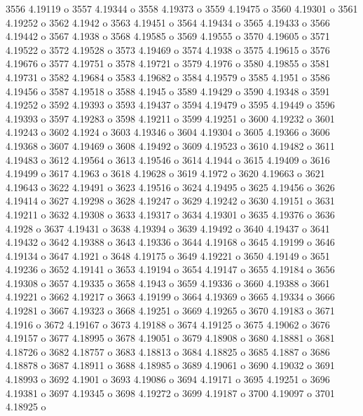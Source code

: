  3556  4.19119  o
 3557  4.19344  o
 3558  4.19373  o
 3559  4.19475  o
 3560  4.19301  o
 3561  4.19252  o
 3562  4.1942  o
 3563  4.19451  o
 3564  4.19434  o
 3565  4.19433  o
 3566  4.19442  o
 3567  4.1938  o
 3568  4.19585  o
 3569  4.19555  o
 3570  4.19605  o
 3571  4.19522  o
 3572  4.19528  o
 3573  4.19469  o
 3574  4.1938  o
 3575  4.19615  o
 3576  4.19676  o
 3577  4.19751  o
 3578  4.19721  o
 3579  4.1976  o
 3580  4.19855  o
 3581  4.19731  o
 3582  4.19684  o
 3583  4.19682  o
 3584  4.19579  o
 3585  4.1951  o
 3586  4.19456  o
 3587  4.19518  o
 3588  4.1945  o
 3589  4.19429  o
 3590  4.19348  o
 3591  4.19252  o
 3592  4.19393  o
 3593  4.19437  o
 3594  4.19479  o
 3595  4.19449  o
 3596  4.19393  o
 3597  4.19283  o
 3598  4.19211  o
 3599  4.19251  o
 3600  4.19232  o
 3601  4.19243  o
 3602  4.1924  o
 3603  4.19346  o
 3604  4.19304  o
 3605  4.19366  o
 3606  4.19368  o
 3607  4.19469  o
 3608  4.19492  o
 3609  4.19523  o
 3610  4.19482  o
 3611  4.19483  o
 3612  4.19564  o
 3613  4.19546  o
 3614  4.1944  o
 3615  4.19409  o
 3616  4.19499  o
 3617  4.1963  o
 3618  4.19628  o
 3619  4.1972  o
 3620  4.19663  o
 3621  4.19643  o
 3622  4.19491  o
 3623  4.19516  o
 3624  4.19495  o
 3625  4.19456  o
 3626  4.19414  o
 3627  4.19298  o
 3628  4.19247  o
 3629  4.19242  o
 3630  4.19151  o
 3631  4.19211  o
 3632  4.19308  o
 3633  4.19317  o
 3634  4.19301  o
 3635  4.19376  o
 3636  4.1928  o
 3637  4.19431  o
 3638  4.19394  o
 3639  4.19492  o
 3640  4.19437  o
 3641  4.19432  o
 3642  4.19388  o
 3643  4.19336  o
 3644  4.19168  o
 3645  4.19199  o
 3646  4.19134  o
 3647  4.1921  o
 3648  4.19175  o
 3649  4.19221  o
 3650  4.19149  o
 3651  4.19236  o
 3652  4.19141  o
 3653  4.19194  o
 3654  4.19147  o
 3655  4.19184  o
 3656  4.19308  o
 3657  4.19335  o
 3658  4.1943  o
 3659  4.19336  o
 3660  4.19388  o
 3661  4.19221  o
 3662  4.19217  o
 3663  4.19199  o
 3664  4.19369  o
 3665  4.19334  o
 3666  4.19281  o
 3667  4.19323  o
 3668  4.19251  o
 3669  4.19265  o
 3670  4.19183  o
 3671  4.1916  o
 3672  4.19167  o
 3673  4.19188  o
 3674  4.19125  o
 3675  4.19062  o
 3676  4.19157  o
 3677  4.18995  o
 3678  4.19051  o
 3679  4.18908  o
 3680  4.18881  o
 3681  4.18726  o
 3682  4.18757  o
 3683  4.18813  o
 3684  4.18825  o
 3685  4.1887  o
 3686  4.18878  o
 3687  4.18911  o
 3688  4.18985  o
 3689  4.19061  o
 3690  4.19032  o
 3691  4.18993  o
 3692  4.1901  o
 3693  4.19086  o
 3694  4.19171  o
 3695  4.19251  o
 3696  4.19381  o
 3697  4.19345  o
 3698  4.19272  o
 3699  4.19187  o
 3700  4.19097  o
 3701  4.18925  o
